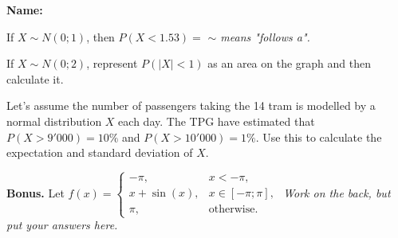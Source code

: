 \documentclass[9pt]{exam}
\begin{document}
\textbf{Name:} \dotfill

\begin{questions}

\question[1] If $X \sim N(0; 1)$, then $P(X < 1.53) = $ \dotfill  \hfill \emph{$\sim$ means "follows a".}


\question[3] If $X \sim N(0; 2)$, represent $P(|X| <  1)$ as an area on the graph and then calculate it.

\begin{center}
\end{center}
\fillwithdottedlines{28mm}


\question[4] Let's assume the number of passengers taking the 14 tram is modelled by a normal distribution $X$ each day. The TPG have estimated that $P(X>9'000) = 10\%$ and $P(X>10'000) = 1\%$. \newline
Use this to calculate the expectation and standard deviation of $X$.


\question[0] \textbf{Bonus.}  Let $f(x) = \left\{ \begin{matrix} -\pi, & x < -\pi, \\ x+\sin(x), & x \in [-\pi; \pi], \\ \pi, & \mbox{otherwise.} \end{matrix} \right.$ \hfill {\small \emph{Work on the back, but put your answers here.}}
\end{questions}
\end{document}
